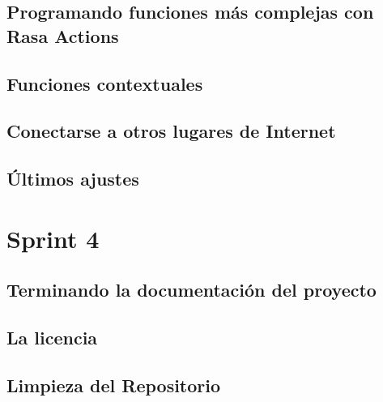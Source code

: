 \subsection{Programando funciones más complejas con Rasa Actions}

\subsection{Funciones contextuales}

\subsection{Conectarse a otros lugares de Internet}

\subsection{Últimos ajustes}

\section{Sprint 4}
\subsection{Terminando la documentación del proyecto}

\subsection{La licencia}

\subsection{Limpieza del Repositorio}


